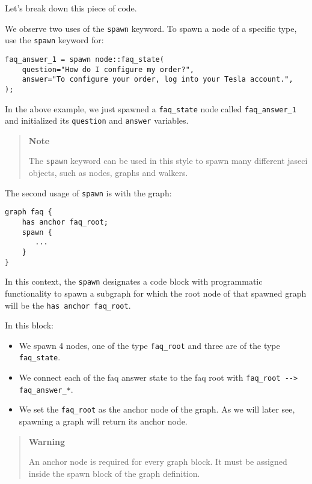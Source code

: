 Let's break down this piece of code.

We observe two uses of the \lstinline!spawn! keyword. To spawn a node of
a specific type, use the \lstinline!spawn! keyword for:

\begin{lstlisting}
faq_answer_1 = spawn node::faq_state(
    question="How do I configure my order?",
    answer="To configure your order, log into your Tesla account.",
);
\end{lstlisting}

In the above example, we just spawned a \lstinline!faq_state! node
called \lstinline!faq_answer_1! and initialized its \lstinline!question!
and \lstinline!answer! variables.

\begin{quote}
    \textbf{Note}

    The \lstinline!spawn! keyword can be used in this style to spawn many
    different jaseci objects, such as nodes, graphs and walkers.
\end{quote}

The second usage of \lstinline!spawn! is with the graph:

\begin{lstlisting}
graph faq {
    has anchor faq_root;
    spawn {
       ...
    }
}
\end{lstlisting}

In this context, the \lstinline!spawn! designates a code block with
programmatic functionality to spawn a subgraph for which the root node
of that spawned graph will be the \lstinline!has anchor faq_root!.

In this block:

\begin{itemize}
    \tightlist
    \item
          We spawn 4 nodes, one of the type \lstinline!faq_root! and three are
          of the type \lstinline!faq_state!.
    \item
          We connect each of the faq answer state to the faq root with
          \lstinline!faq_root --> faq_answer_*!.
    \item
          We set the \lstinline!faq_root! as the anchor node of the graph. As we
          will later see, spawning a graph will return its anchor node.
\end{itemize}

\begin{quote}
    \textbf{Warning}

    An anchor node is required for every graph block. It must be assigned
    inside the spawn block of the graph definition.
\end{quote}

